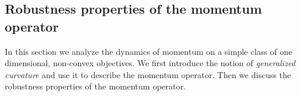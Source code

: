 \documentclass{article} %
\newcommand{\forjian}[1]{{\color{magenta}FOR JIAN: #1}}
\begin{document}



\subsection{Robustness properties of the momentum operator}
\vspace{-0.2em}
\label{sec:robust_properties}
In this section we analyze the dynamics of momentum on a simple class of one dimensional, non-convex objectives.
We first introduce the notion of {\em generalized curvature} and use it to describe the momentum operator.
Then we discuss the robustness properties of the momentum operator. 
\end{document}
